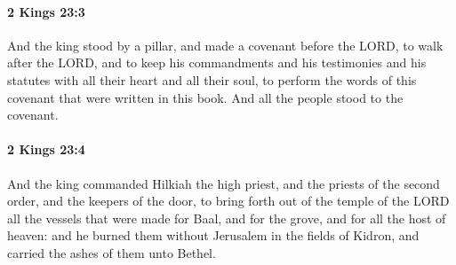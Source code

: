 		\paragraph{2 Kings 23:3} %
			\label{2KINGS-23-3}

			And the king stood by a pillar, and made a covenant before the LORD, to walk after the LORD, and to keep his commandments and his testimonies and his statutes with all their heart and all their soul, to perform the words of this covenant that were written in this book. And all the people stood to the covenant.


		\paragraph{2 Kings 23:4} %
			\label{2KINGS-23-4}

			And the king commanded Hilkiah the high priest, and the priests of the second order, and the keepers of the door, to bring forth out of the temple of the LORD all the vessels that were made for Baal, and for the grove, and for all the host of heaven: and he burned them without Jerusalem in the fields of Kidron, and carried the ashes of them unto Bethel.

